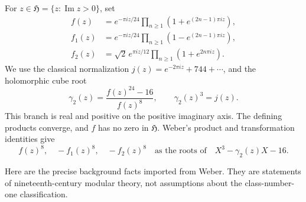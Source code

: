\documentclass[11pt]{article}
\newcommand{\HH}{\mathfrak H}
\begin{document}
For \(z\in\HH=\{z:\operatorname{Im}z>0\}\), set
\begin{align*}
 f(z)&=e^{-\pi iz/24}\prod_{n\ge1}(1+e^{(2n-1)\pi iz}),\\
 f_1(z)&=e^{-\pi iz/24}\prod_{n\ge1}(1-e^{(2n-1)\pi iz}),\\
 f_2(z)&=\sqrt2\,e^{\pi iz/12}\prod_{n\ge1}(1+e^{2n\pi iz}).
\end{align*}
We use the classical normalization \(j(z)=e^{-2\pi iz}+744+\cdots\),
and the holomorphic cube root
\[
 \gamma_2(z)=\frac{f(z)^{24}-16}{f(z)^8},\qquad \gamma_2(z)^3=j(z).
\]
This branch is real and positive on the positive imaginary axis.
The defining products converge, and \(f\) has no zero in \(\HH\).
Weber's product and transformation identities give
\begin{equation}\label{weber-cubic}
 f(z)^8,\quad -f_1(z)^8,\quad -f_2(z)^8
 \quad\text{as the roots of}\quad X^3-\gamma_2(z)X-16.
\end{equation}

Here are the precise background facts imported from Weber. They are
statements of nineteenth-century modular theory, not assumptions about
the class-number-one classification.
\end{document}
